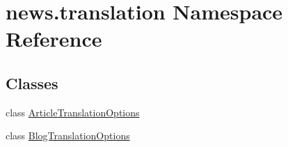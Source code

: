 \hypertarget{namespacenews_1_1translation}{}\section{news.\+translation Namespace Reference}
\label{namespacenews_1_1translation}
\subsection*{Classes}
\begin{DoxyCompactItemize}
\item 
class \mbox{\hyperlink{classnews_1_1translation_1_1_article_translation_options}{Article\+Translation\+Options}}
\item 
class \mbox{\hyperlink{classnews_1_1translation_1_1_blog_translation_options}{Blog\+Translation\+Options}}
\end{DoxyCompactItemize}
